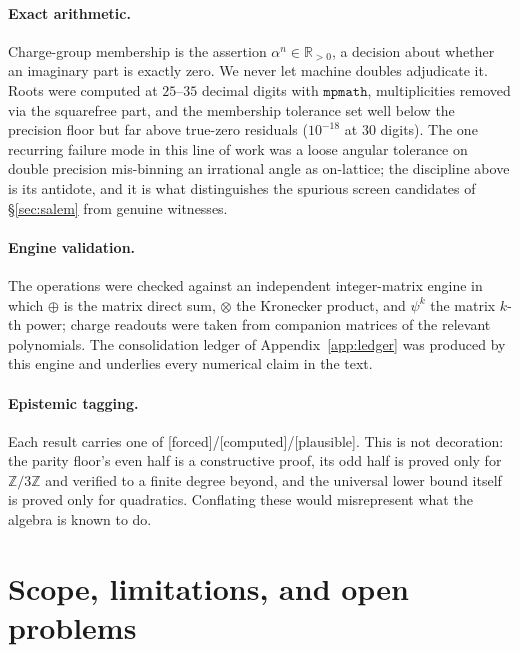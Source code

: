 \documentclass[11pt]{article}
\theoremstyle{definition}
\theoremstyle{remark}
\newcommand{\Z}{\mathbb{Z}}
\newcommand{\R}{\mathbb{R}}
\newcommand{\Adams}[1]{\psi^{#1}}
\newcommand{\dsum}{\oplus}
\newcommand{\tens}{\otimes}
\newcommand{\Zmod}[1]{\Z/#1\Z}
\newcommand{\status}[1]{{\small\textsf{[#1]}}}
\newcommand{\forced}{\status{forced}}
\newcommand{\computed}{\status{computed}}
\newcommand{\plausible}{\status{plausible}}
\begin{document}
\paragraph{Exact arithmetic.} Charge-group membership is the assertion
$\alpha^{n}\in\R_{>0}$, a decision about whether an imaginary part is exactly zero. We never
let machine doubles adjudicate it. Roots were computed at $25$--$35$ decimal digits with
$\mathtt{mpmath}$, multiplicities removed via the squarefree part, and the membership
tolerance set well below the precision floor but far above true-zero residuals
($10^{-18}$ at $30$ digits). The one recurring failure mode in this line of work was a loose
angular tolerance on double precision mis-binning an irrational angle as on-lattice; the
discipline above is its antidote, and it is what distinguishes the spurious screen
candidates of \S\ref{sec:salem} from genuine witnesses.

\paragraph{Engine validation.} The operations were checked against an independent
integer-matrix engine in which $\dsum$ is the matrix direct sum, $\tens$ the Kronecker
product, and $\Adams k$ the matrix $k$-th power; charge readouts were taken from companion
matrices of the relevant polynomials. The consolidation ledger of
Appendix~\ref{app:ledger} was produced by this engine and underlies every numerical claim in
the text.

\paragraph{Epistemic tagging.} Each result carries one of \forced{}/\computed{}/\plausible{}.
This is not decoration: the parity floor's even half is a constructive proof, its odd half is
proved only for $\Zmod3$ and verified to a finite degree beyond, and the universal lower
bound itself is proved only for quadratics. Conflating these would misrepresent what the
algebra is known to do.

\section{Scope, limitations, and open problems}\label{sec:scope}
\end{document}
